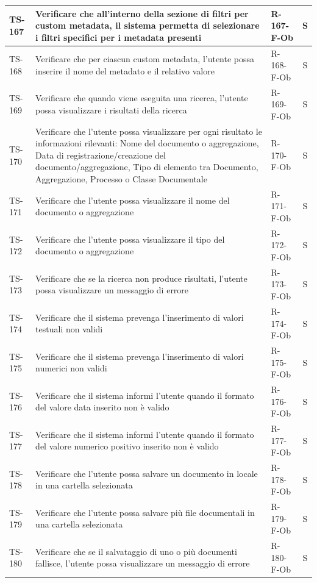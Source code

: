\documentclass[a4paper,12pt]{article}
\begin{document}
\begin{longtable}{|p{1.5cm}|p{8.3cm}|p{2.4cm}|c|}
\hline
TS-167 & Verificare che all'interno della sezione di filtri per custom metadata, il sistema permetta di selezionare i filtri specifici per i metadata presenti & R-167-F-Ob & S \\
\hline
TS-168 & Verificare che per ciascun custom metadata, l'utente possa inserire il nome del metadato e il relativo valore & R-168-F-Ob & S \\
\hline
TS-169 & Verificare che quando viene eseguita una ricerca, l'utente possa visualizzare i risultati della ricerca & R-169-F-Ob & S \\
\hline
TS-170 & Verificare che l'utente possa visualizzare per ogni risultato le informazioni rilevanti: Nome del documento o aggregazione, Data di registrazione/creazione del documento/aggregazione, Tipo di elemento tra Documento, Aggregazione, Processo o Classe Documentale & R-170-F-Ob & S \\
\hline
TS-171 & Verificare che l'utente possa visualizzare il nome del documento o aggregazione & R-171-F-Ob & S \\
\hline
TS-172 & Verificare che l'utente possa visualizzare il tipo del documento o aggregazione & R-172-F-Ob & S \\
\hline
TS-173 & Verificare che se la ricerca non produce risultati, l'utente possa visualizzare un messaggio di errore & R-173-F-Ob & S \\
\hline
TS-174 & Verificare che il sistema prevenga l'inserimento di valori testuali non validi & R-174-F-Ob & S \\
\hline
TS-175 & Verificare che il sistema prevenga l'inserimento di valori numerici non validi & R-175-F-Ob & S \\
\hline
TS-176 & Verificare che il sistema informi l'utente quando il formato del valore data inserito non è valido & R-176-F-Ob & S \\
\hline
TS-177 & Verificare che il sistema informi l'utente quando il formato del valore numerico positivo inserito non è valido & R-177-F-Ob & S \\
\hline
TS-178 & Verificare che l'utente possa salvare un documento in locale in una cartella selezionata & R-178-F-Ob & S \\
\hline
TS-179 & Verificare che l'utente possa salvare più file documentali in una cartella selezionata & R-179-F-Ob & S \\
\hline
TS-180 & Verificare che se il salvataggio di uno o più documenti fallisce, l'utente possa visualizzare un messaggio di errore & R-180-F-Ob & S \\

\end{longtable}
\end{document}
